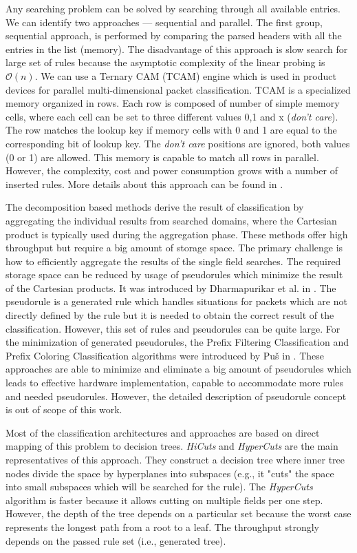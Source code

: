 Any searching problem can be solved by searching through all available entries. We can identify two approaches --- sequential and parallel.
The first group, sequential approach, is performed by comparing the parsed headers with all the entries in the list (memory). 
The disadvantage of this approach is slow search for large set of rules because the asymptotic complexity of the 
linear probing is $\mathcal{O}(n)$. 
We can use a Ternary CAM (TCAM) engine which is used in product devices for parallel multi-dimensional packet classification. 
TCAM is a specialized memory organized in rows. Each row is composed of number of simple memory cells, where each cell can be set to three
different values 0,1 and x (\textit{don't care}). The row matches the lookup key if memory cells with 0 and 1 are equal to the corresponding bit
of lookup key. The \textit{don't care} positions are ignored, both values (0 or 1) are allowed. 
This memory is capable to match all rows in parallel. However, the complexity, cost and power consumption grows with a number of inserted rules. 
More details about this approach can be found in \cite{PusPhd}.

The decomposition based methods derive the result of classification by aggregating the individual results from searched domains, 
where the Cartesian product is typically used during the aggregation phase.
These methods offer high throughput but require
a big amount of storage space. The primary challenge is how to efficiently aggregate the results of the single field searches. 
The required storage space can be reduced by usage of pseudorules which minimize the result of the Cartesian products. It was introduced 
by Dharmapurikar et al. in \cite{DharmapurikarMSCA}.
The pseudorule is a generated rule which handles situations for packets which are not directly defined by the rule but it is needed to
obtain the correct result of the classification. However, this set of rules and pseudorules can be quite large. 
For the minimization of generated pseudorules, the Prefix Filtering Classification and Prefix Coloring Classification algorithms were 
introduced  by Pu\v{s} in \cite{PusPhd}. These approaches are able to minimize and eliminate a big amount of pseudorules
which leads to effective hardware implementation, capable to accommodate more rules and needed pseudorules. 
However, the detailed description of pseudorule concept is out of scope of this work.

Most of the classification architectures and approaches are based on direct mapping of this problem to decision trees. 
\textit{HiCuts} \cite{And99HiCuts} and \textit{HyperCuts} \cite{SingHyperCuts} are the main representatives of this approach. 
They construct a decision tree where inner tree nodes divide the space by hyperplanes 
into subspaces (e.g., it "cuts" the space into small subspaces which will be searched for the rule). 
The \textit{HyperCuts} algorithm is faster because it allows cutting on 
multiple fields per one step. However, the depth of the tree depends on a particular set because the worst case 
represents the longest path from a root to a leaf. 
The throughput strongly depends on the passed rule set (i.e., generated tree).  


